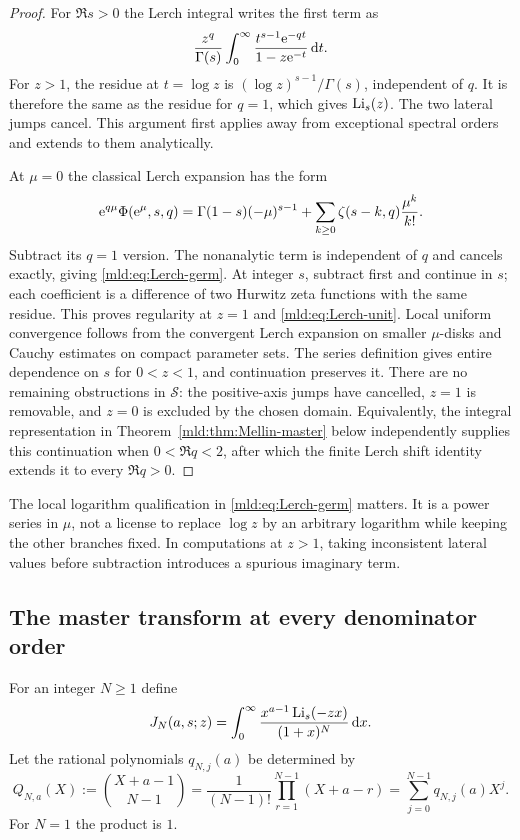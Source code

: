 \begin{proof}
For $\Re s>0$ the Lerch integral writes the first term as
\[
 \frac{z^q}{\Gamma(s)}\int_0^\infty
          \frac{t^{s-1}\mathrm e^{-qt}}{1-z\mathrm e^{-t}}\,\mathrm{d} t.
\]
For $z>1$, the residue at $t=\log z$ is
$(\log z)^{s-1}/\Gamma(s)$, independent of $q$. It is therefore the same as the residue for $q=1$, which gives $\operatorname{Li}_s(z)$. The two lateral jumps cancel. This argument first applies away from exceptional spectral orders and extends to them analytically.

At $\mu=0$ the classical Lerch expansion \cite[\S25.14]{DLMFlerch} has the form
\[
 \mathrm e^{q\mu}\Phi(\mathrm e^\mu,s,q)
 =\Gamma(1-s)(-\mu)^{s-1}
       +\sum_{k\ge0}\zeta(s-k,q)\frac{\mu^k}{k!}.
\]
Subtract its $q=1$ version. The nonanalytic term is independent of $q$ and cancels exactly, giving \eqref{mld:eq:Lerch-germ}. At integer $s$, subtract first and continue in $s$; each coefficient is a difference of two Hurwitz zeta functions with the same residue. This proves regularity at $z=1$ and \eqref{mld:eq:Lerch-unit}. Local uniform convergence follows from the convergent Lerch expansion on smaller $\mu$-disks and Cauchy estimates on compact parameter sets. The series definition gives entire dependence on $s$ for $0<z<1$, and continuation preserves it. There are no remaining obstructions in $\mathcal S$: the positive-axis jumps have cancelled, $z=1$ is removable, and $z=0$ is excluded by the chosen domain. Equivalently, the integral representation in Theorem~\ref{mld:thm:Mellin-master} below independently supplies this continuation when $0<\Re q<2$, after which the finite Lerch shift identity extends it to every $\Re q>0$.
\end{proof}

\begin{remark}
The local logarithm qualification in \eqref{mld:eq:Lerch-germ} matters. It is a power series in $\mu$, not a license to replace $\log z$ by an arbitrary logarithm while keeping the other branches fixed. In computations at $z>1$, taking inconsistent lateral values before subtraction introduces a spurious imaginary term.
\end{remark}

\subsection{The master transform at every denominator order}

For an integer $N\ge1$ define
\begin{equation}\label{mld:eq:JN-definition}
 J_N(a,s;z)=\int_0^\infty
       \frac{x^{a-1}\operatorname{Li}_s(-zx)}{(1+x)^N}\,\mathrm{d} x.
\end{equation}
Let the rational polynomials $q_{N,j}(a)$ be determined by
\begin{equation}\label{mld:eq:q-polynomial}
 Q_{N,a}(X):=\binom{X+a-1}{N-1}
 =\frac1{(N-1)!}\prod_{r=1}^{N-1}(X+a-r)
 =\sum_{j=0}^{N-1}q_{N,j}(a)X^j.
\end{equation}
For $N=1$ the product is $1$.

